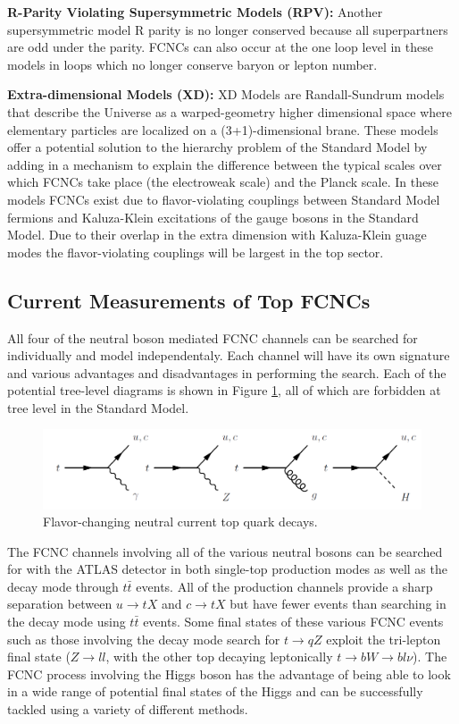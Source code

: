 \textbf{R-Parity Violating Supersymmetric Models (RPV): }  Another supersymmetric model R parity is no longer conserved because all superpartners are odd under the parity.  FCNCs can also occur at the one loop level in these models in loops which no longer conserve baryon or lepton number.\cite{RPVSusyFCNC}

\textbf{Extra-dimensional Models (XD): }  XD Models are Randall-Sundrum models that describe the Universe as a warped-geometry higher dimensional space where elementary particles are localized on a (3+1)-dimensional brane.  These models offer a potential solution to the hierarchy problem of the Standard Model by adding in a mechanism to explain the difference between the typical scales over which FCNCs take place (the electroweak scale) and the Planck scale.  In these models FCNCs exist due to flavor-violating couplings between Standard Model fermions and Kaluza-Klein excitations of the gauge bosons in the Standard Model\cite{XDFCNC}.  Due to their overlap in the extra dimension with Kaluza-Klein guage modes the flavor-violating couplings will be largest in the top sector.


\subsection{Current Measurements of Top FCNCs}

All four of the neutral boson mediated FCNC channels can be searched for individually and model independentaly.  Each channel will have its own signature and various advantages and disadvantages in performing the search.  Each of the potential tree-level diagrams is shown in Figure \ref{fig:AllFCNCs}, all of which are forbidden at tree level in the Standard Model.  %
\begin{figure}[h!]
	\centering
	\includegraphics[width=\columnwidth]{../ThesisImages/Theory/AllFCNCDiagrams.png}
	\caption{Flavor-changing neutral current top quark decays.}
	\label{fig:AllFCNCs}
\end{figure}

The FCNC channels involving all of the various neutral bosons can be searched for with the ATLAS detector in both single-top production modes as well as the decay mode through $t\bar{t}$ events.  All of the production channels provide a sharp separation between $u\rightarrow tX$ and $c\rightarrow tX$ but have fewer events than searching in the decay mode using $t\bar{t}$ events.  Some final states of these various FCNC events such as those involving the decay mode search for $t\rightarrow q Z$ exploit the tri-lepton final state ($Z\rightarrow ll$, with the other top decaying leptonically $t\rightarrow bW\rightarrow bl\nu$).  The FCNC process involving the Higgs boson has the advantage of being able to look in a wide range of potential final states of the Higgs and can be successfully tackled using a variety of different methods.

